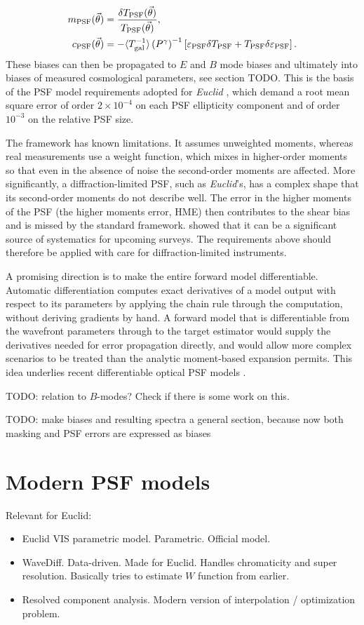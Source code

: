 \documentclass[11pt]{book}
\DeclareRobustCommand{\PSF}{\ifmmode\text{PSF}\else d\fi}
\DeclareRobustCommand{\gal}{\ifmmode\text{gal}\else d\fi}
\newcommand{\br}[1]{\ensuremath{\left( #1 \right)}}
\newcommand{\sbr}[1]{\ensuremath{\left[ #1 \right]}}
\begin{document}
	\begin{align}
		m_\PSF(\vec\theta) &= \frac{\delta T_\PSF(\vec\theta)}{T_\PSF(\vec\theta)},\\
		c_\PSF(\vec\theta) &= -\langle T_\gal^{-1} \rangle \br{P^{\gamma}}^{-1}\sbr{\varepsilon_\PSF\delta T_\PSF+T_\PSF\delta\varepsilon_\PSF}.
	\end{align}
	These biases can then be propagated to $E$ and $B$ mode biases and ultimately into biases of measured cosmological parameters, see section TODO. This is the basis of the PSF model requirements adopted for \textit{Euclid} \cite{laureijs2011,racca2016}, which demand a root mean square error of order $2\times10^{-4}$ on each PSF ellipticity component and of order $10^{-3}$ on the relative PSF size.

The framework has known limitations. It assumes unweighted moments, whereas real measurements use a weight function, which mixes in higher-order moments so that even in the absence of noise the second-order moments are affected. More significantly, a diffraction-limited PSF, such as \textit{Euclid}'s, has a complex shape that its second-order moments do not describe well. The error in the higher moments of the PSF (the higher moments error, HME) then contributes to the shear bias and is missed by the standard framework. \cite{zhang2021} showed that it can be a significant source of systematics for upcoming surveys. The requirements above should therefore be applied with care for diffraction-limited instruments.

A promising direction is to make the entire forward model differentiable. Automatic differentiation \cite{baydin2017} computes exact derivatives of a model output with respect to its parameters by applying the chain rule through the computation, without deriving gradients by hand. A forward model that is differentiable from the wavefront parameters through to the target estimator would supply the derivatives needed for error propagation directly, and would allow more complex scenarios to be treated than the analytic moment-based expansion permits. This idea underlies recent differentiable optical PSF models \cite{liaudat2023wavediff}.

TODO: relation to $B$-modes? Check if there is some work on this.

TODO: make biases and resulting spectra a general section, because now both masking and PSF errors are expressed as biases

\section{Modern PSF models}
Relevant for Euclid:
\begin{itemize}
	\item Euclid VIS parametric model. Parametric. Official model.
	\item WaveDiff. Data-driven. Made for Euclid. Handles chromaticity and super resolution. Basically tries to estimate $W$ function from earlier.
	\item Resolved component analysis. Modern version of interpolation / optimization problem.
\end{itemize}
\end{document}
